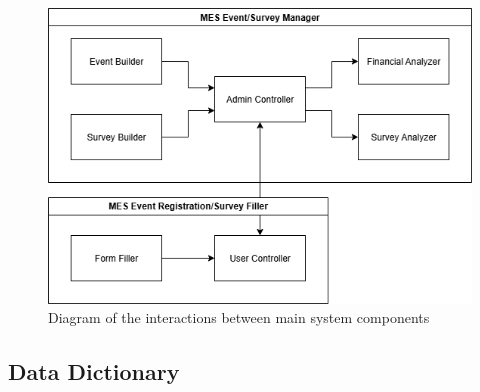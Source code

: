 \documentclass[12pt]{article}
\begin{document}
\begin{center}
\begin{figure}[H]
    \centering
    \includegraphics[width=1\linewidth]{images/business_data_model.png}
    \caption{Diagram of the interactions between main system components}\label{fig:businessdata}
\end{figure}
\end{center}
\subsection{Data Dictionary}
\end{document}
